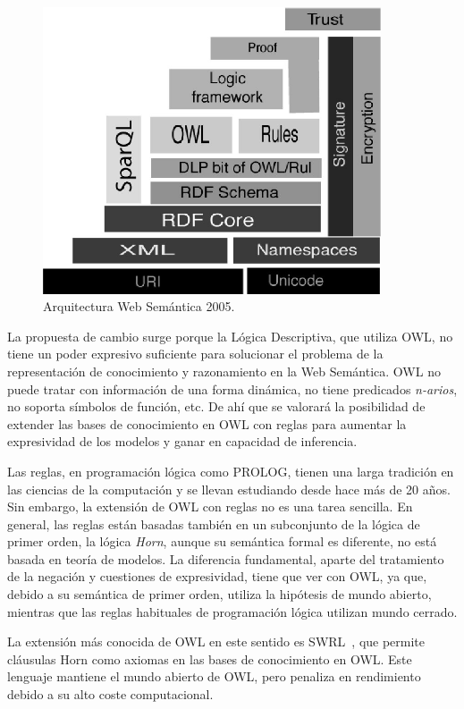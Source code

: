 \begin{figure}[!htbp]
\centering
	\includegraphics[width=10cm]{images/sw-stack-2005}
\caption{Arquitectura Web Semántica 2005.}
\label{fig:stack-2005}
\end{figure}

La propuesta de cambio surge porque la Lógica Descriptiva, que utiliza \gls{OWL}, no
tiene un poder expresivo suficiente para solucionar el problema de la
representación de conocimiento y razonamiento en la Web Semántica. OWL no puede
tratar con información de una forma dinámica, no tiene predicados \textit{n-arios}, no
soporta símbolos de función, etc. De ahí que se valorará la posibilidad de extender las bases
de conocimiento en OWL con reglas para aumentar la expresividad de los modelos y
ganar en capacidad de inferencia.

Las reglas, en programación lógica como PROLOG, tienen una larga tradición en
las ciencias de la computación y se llevan estudiando desde hace más de 20 años. Sin
embargo, la extensión de OWL con reglas no es una tarea sencilla. En general, las reglas 
están basadas también en un subconjunto de la lógica de primer orden, la
lógica \textit{Horn}, aunque su semántica formal es diferente, no está basada en teoría de modelos. La diferencia fundamental, aparte del tratamiento
de la negación y cuestiones de expresividad, tiene que ver con OWL, ya que, 
debido a su semántica de primer orden, utiliza la hipótesis de mundo abierto,
mientras que las reglas habituales de programación lógica utilizan mundo cerrado. 

La extensión más conocida de OWL en este sentido es \gls{SWRL}~\cite{Swrl}, que permite cláusulas
Horn como axiomas en las bases de conocimiento en OWL. Este lenguaje mantiene
el mundo abierto de OWL, pero penaliza en rendimiento debido a su alto coste computacional.

